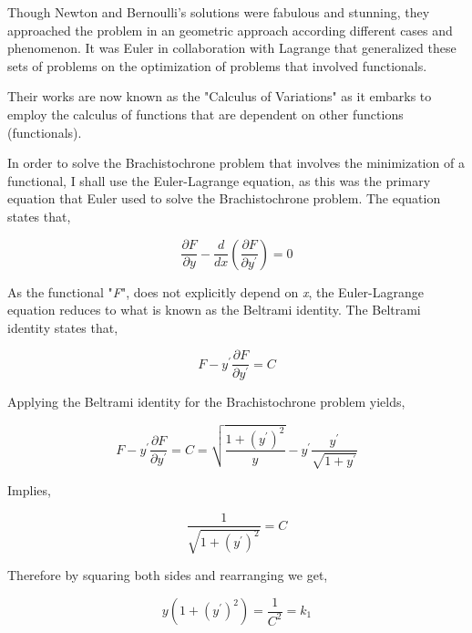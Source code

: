 

{Though Newton and Bernoulli's solutions were fabulous and stunning, they approached the problem in an geometric approach according different cases and phenomenon. It was Euler in collaboration with Lagrange that generalized these sets of problems on the optimization of problems that involved functionals.}

{Their works are now known as the "Calculus of Variations" as it embarks to employ the calculus of functions that are dependent on other functions (functionals).}

{In order to solve the Brachistochrone problem that involves the minimization of a functional, I shall use the Euler-Lagrange equation, as this was the primary equation that Euler used to solve the Brachistochrone problem. The equation states that,}

	$$\frac{\partial F}{\partial y} - \frac{d}{dx}\left(\frac{\partial F}{\partial y^{\prime}}\right) = 0$$

{As the functional "\textit{F}", does not explicitly depend on \textit{x}, the Euler-Lagrange equation reduces to what is known as the Beltrami identity. The Beltrami identity states that,}

	$$F - y^{\prime}\frac{\partial F}{\partial y^{\prime}} = C$$




	{Applying the Beltrami identity for the Brachistochrone problem yields,}

		$$F - y^{\prime}\frac{\partial F}{\partial y^{\prime}} = C = \sqrt{\frac{1 + \left(y^{\prime}\right)^2}{y}} - y^{\prime}\frac{y^{\prime}}{\sqrt{1 + y^{\prime}}}$$

	{Implies,}

		$$\frac{1}{\sqrt{1 + \left(y^{\prime}\right)^2}} = C$$

	{Therefore by squaring both sides and rearranging we get,}

		$$y\left(1 + \left(y^{\prime}\right)^2\right) = \frac{1}{C^2} = k_{1}$$

